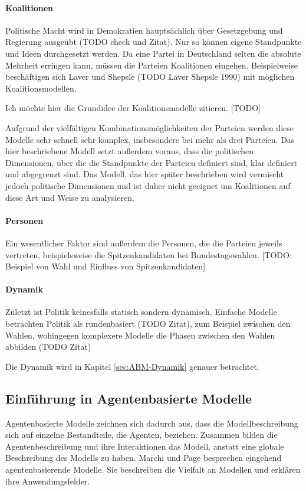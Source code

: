 \paragraph{Koalitionen}
Politische Macht wird in Demokratien hauptsächlich über Gesetzgebung und Regierung ausgeübt (TODO check und Zitat). Nur so können eigene Standpunkte und Ideen durchgesetzt werden. Da eine Partei in Deutschland selten die absolute Mehrheit erringen kann, müssen die Parteien Koalitionen eingehen. Beispielweise beschäftigen sich Laver und Shepsle (TODO Laver Shepsle 1990) mit möglichen Koalitionsmodellen.

Ich möchte hier die Grundidee der Koalitionsmodelle zitieren. [TODO]

Aufgrund der vielfältigen Kombinationsmöglichkeiten der Parteien werden diese Modelle sehr schnell sehr komplex, insbesondere bei mehr als drei Parteien. Das hier beschriebene Modell setzt außerdem voraus, dass die politischen Dimensionen, über die die Standpunkte der Parteien definiert sind, klar definiert und abgegrenzt sind. Das Modell, das hier später beschrieben wird vermischt jedoch politische Dimensionen und ist daher nicht geeignet um Koalitionen auf diese Art und Weise zu analysieren.

\paragraph{Personen}
Ein wesentlicher Faktor sind außerdem die Personen, die die Parteien jeweils vertreten, beispielsweise die Spitzenkandidaten bei Bundestagswahlen. 
[TODO: Beispiel von Wahl und Einfluss von Spitzenkandidaten]

\paragraph{Dynamik}
Zuletzt ist Politik keinesfalls statisch sondern dynamisch. Einfache Modelle betrachten Politik als rundenbasiert (TODO Zitat), zum Beispiel zwischen den Wahlen, wohingegen komplexere Modelle die Phasen zwischen den Wahlen abbilden (TODO Zitat)

Die Dynamik wird in Kapitel \ref{sec:ABM-Dynamik} genauer betrachtet.

\subsection{Einführung in Agentenbasierte Modelle}

Agentenbasierte Modelle zeichnen sich dadurch aus, dass die Modellbeschreibung sich auf einzelne Bestandteile, die Agenten, beziehen. Zusammen bilden die Agentenbeschreibung und ihre Interaktionen das Modell, anstatt eine globale Beschreibung des Modells zu haben. Marchi und Page \citep{marchi2014ABMs} besprechen eingehend agentenbasierende Modelle. Sie beschreiben die Vielfalt an Modellen und erklären ihre Anwendungsfelder.

